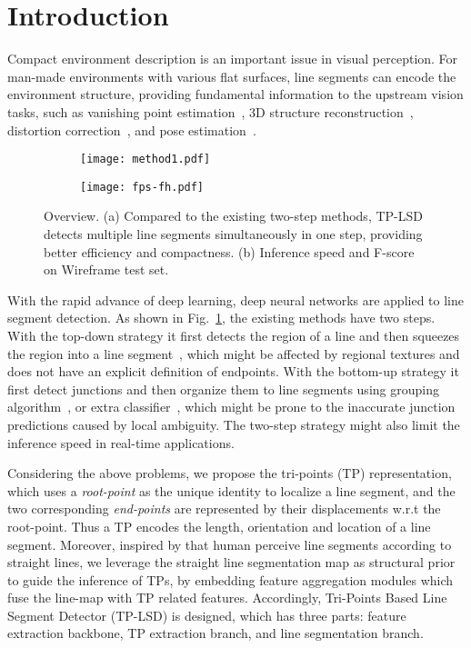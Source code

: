 \documentclass[runningheads]{llncs}
\begin{document}
\section{Introduction}
Compact environment description is an important issue in visual perception. For man-made environments with various flat surfaces, line segments can encode the environment structure, providing fundamental information to the upstream vision tasks, such as vanishing point estimation~\cite{vanish2002, vanish2011},  3D structure reconstruction~\cite{rescontruc2013}, distortion correction~\cite{Distortion}, and pose estimation~\cite{Pose,CPIE}.

\begin{figure}[thbp]
\begin{center}
     \begin{subfigure}[b]{0.62\textwidth}
         \centering
         \texttt{[image: method1.pdf]}
         \caption{}
         \label{method}
     \end{subfigure}
     \begin{subfigure}[b]{0.37\textwidth}
         \centering
         \texttt{[image: fps-fh.pdf]}
         \caption{}
         \label{fps}
     \end{subfigure}
   \end{center}
    
    \caption{Overview. (a) Compared to the existing two-step methods, TP-LSD detects multiple line segments simultaneously in one step, providing better efficiency and compactness. (b) Inference speed and F-score on Wireframe test set.}
\end{figure}


With the rapid advance of deep learning, deep neural networks are applied to line segment detection. As shown in Fig.~\ref{method}, the existing methods have two steps. With the top-down strategy it first detects the region of a line and then squeezes the region into a line segment~\cite{AFM}, which might be affected by regional textures and does not have an explicit definition of endpoints. With the bottom-up strategy it first detect junctions and then organize them to line segments using grouping algorithm~\cite{Wireframe, Wireframe-er}, or extra classifier~\cite{PPG, LCNN, HAWP}, which might be prone to the inaccurate junction predictions caused by local ambiguity. The two-step strategy might also limit the inference speed in real-time applications.

Considering the above problems, we propose the tri-points (TP) representation, which uses a \textsl{root-point} as the unique identity to localize a line segment, and the two corresponding \textsl{end-points} are represented by their displacements w.r.t the root-point. Thus a TP encodes the length, orientation and location of a line segment. Moreover, inspired by that human perceive line segments according to straight lines, we leverage the straight line segmentation map as structural prior to guide the inference of TPs, by embedding feature aggregation modules which fuse the line-map with TP related features. Accordingly, Tri-Points Based Line Segment Detector (TP-LSD) is designed, which has three parts: feature extraction backbone, TP extraction branch, and line segmentation branch.
\end{document}
